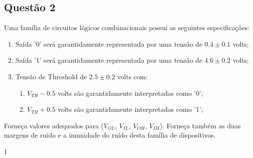 \documentclass{article}
\begin{document}
        \subsection{Questão 2}
            \begin{exercise}
                Uma família de circuitos lógicos combinacionais possui as seguintes especificações:
                    \begin{enumerate}
                        \item Saída '0' será garantidamente representada por uma tensão de $0.4 \pm 0.1$ volts;
                        \item Saída '1' será garantidamente representada por uma tensão de $4.6 \pm 0.2$ volts;
                        \item Tensão de Threshold de $2.5 \pm 0.2$ volts com:
                            \begin{enumerate}[noitemsep]
                                \item $V_{TH}-0.5$ volts são garantidamente interpretadas como '0';
                                \item $V_{TH}+0.5$ volts são garantidamente interpretadas como '1';
                            \end{enumerate}
                    \end{enumerate}
                Forneça valores adequados para ($V_{OL}$, $V_{IL}$, $V_{OH}$, $V_{IH}$). Forneça também as duas margens de ruído e a imunidade do ruído desta família de dispositivos.
            \end{exercise}
            \begin{resolution}
                1
            \end{resolution}

\newpage
\end{document}
